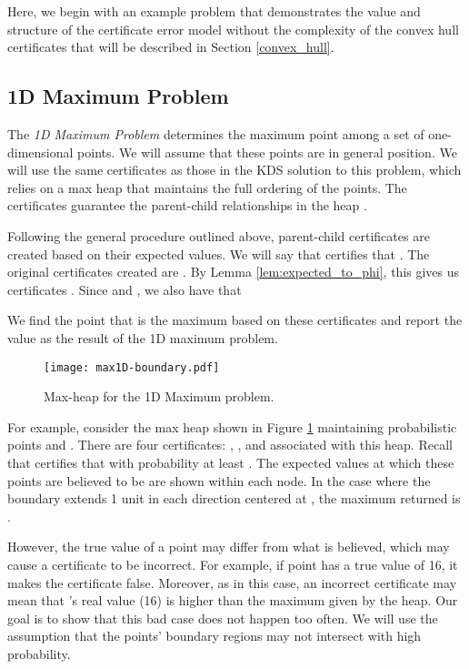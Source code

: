 \documentclass[11pt]{article}
\begin{document}
Here, we begin with an example problem that demonstrates the value and structure of the certificate error model without the complexity of the convex hull certificates that will be described in Section \ref{convex_hull}.  

\subsection{1D Maximum Problem} 
The \emph{1D Maximum Problem} determines
the maximum point among a set of  one-dimensional points.  
We will assume that these points are in general position. 
We will use the same certificates as those in the KDS solution to this 
problem, which relies on a max
heap that maintains the full ordering of the points.  The 
certificates guarantee the parent-child relationships in the
heap \cite{Basch99MobileData}.

Following the general procedure outlined above, parent-child certificates are created based on their expected values.  We will say that  certifies that .  The original certificates created are .  By Lemma \ref{lem:expected_to_phi}, this gives us certificates .
Since  and , we also have that

We find the point  that is the maximum based on these certificates and report the value  as the result of the 1D maximum problem.

\begin{figure}[h]
\begin{center}
 \centering
\texttt{[image: max1D-boundary.pdf]}
\caption{Max-heap for the 1D Maximum problem.}
\label{fig:max1D}
\end{center}
\end{figure}

For example, consider the max heap shown in Figure \ref{fig:max1D}
maintaining probabilistic points  and .  There are four
certificates: , ,  and 
associated with this heap. Recall that  certifies that  with probability at least .  The
expected values  at which these points are believed to be are shown within each
node.  In the case where the boundary extends 1 unit in each direction centered at , the maximum returned is .

However, the true value of a point may differ from what is
believed, which may cause a certificate to be incorrect. For example,
if point  has a true value of 16, it makes the certificate
 false. Moreover, as in this case, an incorrect
certificate may mean that 's real value (16) is higher than the
maximum given by the heap.  Our goal is to show that this bad case does not happen too often.  We will use the assumption that the  points' boundary regions may not intersect with high probability.
\end{document}
